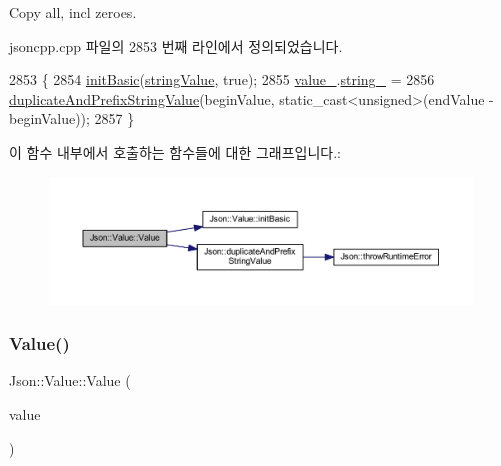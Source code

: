 Copy all, incl zeroes. 



jsoncpp.\+cpp 파일의 2853 번째 라인에서 정의되었습니다.


\begin{DoxyCode}
2853                                                          \{
2854   \hyperlink{class_json_1_1_value_a32b86b71564157f40f880f5736be822a}{initBasic}(\hyperlink{namespace_json_a7d654b75c16a57007925868e38212b4ea804ef857affea2d415843c73f261c258}{stringValue}, \textcolor{keyword}{true});
2855   \hyperlink{class_json_1_1_value_aef578244546212705b9f81eb84d7e151}{value\_}.\hyperlink{union_json_1_1_value_1_1_value_holder_a70ac2b153bc405527baa3850d2ddc3cb}{string\_} =
2856       \hyperlink{namespace_json_a9795a09a0141d1f12d307c4386aeaee6}{duplicateAndPrefixStringValue}(beginValue, static\_cast<unsigned>(endValue
       - beginValue));
2857 \}
\end{DoxyCode}
이 함수 내부에서 호출하는 함수들에 대한 그래프입니다.\+:\nopagebreak
\begin{figure}[H]
\begin{center}
\leavevmode
\includegraphics[width=350pt]{class_json_1_1_value_a39fa09d1902efbd4350e1236db920571_cgraph}
\end{center}
\end{figure}
\mbox{\label{class_json_1_1_value_a081830e95f88a37054da7e46c65b0766}} 
\subsubsection{\texorpdfstring{Value()}{Value()}\hspace{0.1cm}{\footnotesize\ttfamily [9/12]}}
{\footnotesize\ttfamily Json\+::\+Value\+::\+Value (\begin{DoxyParamCaption}\item[{const \hyperlink{class_json_1_1_static_string}{Static\+String} \&}]{value }\end{DoxyParamCaption})}



